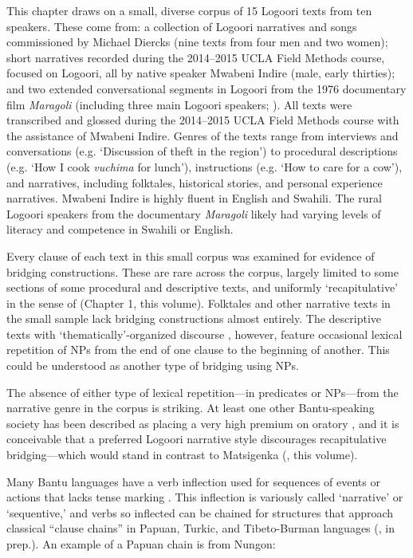 \documentclass[output=paper]{LSP/langsci}
\begin{document}
This chapter draws on a small, diverse corpus of 15 Logoori texts from ten speakers. These come from: a collection of Logoori narratives and songs commissioned by Michael Diercks (nine texts from four men and two women); short narratives recorded during the 2014--2015 UCLA Field Methods course, focused on Logoori, all by native speaker Mwabeni Indire (male, early thirties); and two extended conversational segments in Logoori from the 1976 documentary film \textit{Maragoli} (including three main Logoori speakers; \citealt{Nichols1976}). All texts were transcribed and glossed during the 2014--2015 UCLA Field Methods course with the assistance of Mwabeni Indire. Genres of the texts range from interviews and conversations (e.g. `Discussion of theft in the region') to procedural descriptions (e.g. `How I cook \textit{vuchima} for lunch'), instructions (e.g. `How to care for a cow'), and narratives, including folktales, historical stories, and personal experience narratives. Mwabeni Indire is highly fluent in English and Swahili. The rural Logoori speakers from the documentary \textit{Maragoli} likely had varying levels of literacy and competence in Swahili or English.

Every clause of each text in this small corpus was examined for evidence of bridging constructions. These are rare across the corpus, largely limited to some sections of some procedural and descriptive texts, and uniformly `recapitulative' in the sense of \citeauthor{guerin18} (Chapter 1, this volume). Folktales and other narrative texts in the small sample lack bridging constructions almost entirely. The descriptive texts with `thematically'-organized discourse \citep{farr99}, however, feature occasional lexical repetition of NPs from the end of one clause to the beginning of another. This could be understood as another type of bridging using NPs.

The absence of either type of lexical repetition—in predicates or NPs—from the narrative genre in the corpus is striking. At least one other Bantu-speaking society has been described as placing a very high premium on oratory \citep{Albert1964}, and it is conceivable that a preferred Logoori narrative style discourages recapitulative bridging—which would stand in contrast to Matsigenka (\citeauthor{emlen18}, this volume). 

Many Bantu languages have a verb inflection used for sequences of events or actions that lacks tense marking \citep{Dalgish1979}. This inflection is variously called `narrative' or `sequentive,' and verbs so inflected can be chained for structures that approach classical ``clause chains'' in Papuan, Turkic, and Tibeto-Burman languages (\citeauthor{sarvasyforth}, in prep.). An example of a Papuan chain is from Nungon:
\end{document}
